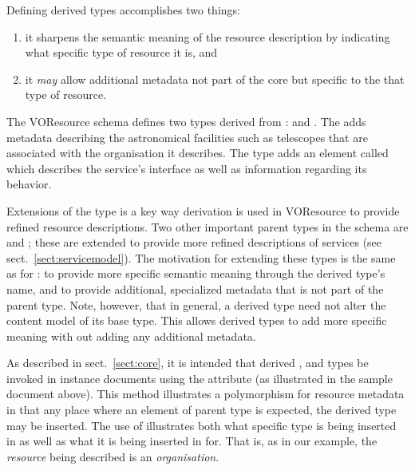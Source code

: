 \documentclass[11pt,a4paper]{ivoa}
\begin{document}
Defining derived  types accomplishes two
things:
\begin{enumerate}
  \item it sharpens the semantic meaning of the resource description by
       indicating what specific type of resource it is, and
  \item it \emph{may} allow additional metadata not part of the core
       but specific to the that type of resource.
\end{enumerate}



The VOResource schema defines two types derived from
:   and
.   The  adds
metadata describing the astronomical facilities such as telescopes
that are associated with the organisation it describes.  The
 type adds an element called
 which describes the service's interface as
well as information regarding its behavior.  



Extensions of the  type is a key way
derivation is used in VOResource to provide refined resource
descriptions.  Two other important parent types in the schema are
 and ; these are
extended to provide more refined descriptions of services (see
sect.~\ref{sect:servicemodel}).  The motivation for extending
these types is the same as for : to provide
more specific semantic meaning through the derived type's name, and to
provide additional, specialized metadata that is not part of the
parent type.  Note, however, that in general, a derived type need not
alter the content model of its base type.  This allows derived types
to add more specific meaning with out adding any additional metadata.



As described in sect.~\ref{sect:core}, it is intended that derived
,  and 
types be invoked in instance documents using the 
attribute (as illustrated in the sample document above).  This method
illustrates a polymorphism for resource metadata in that any place where
an element of parent type is expected, the derived type may be inserted.
The use of  illustrates both what specific type is being
inserted in as well as what it is being inserted in for.  That is, as in
our example, the \emph{resource} being described is an
\emph{organisation}.  
\end{document}
